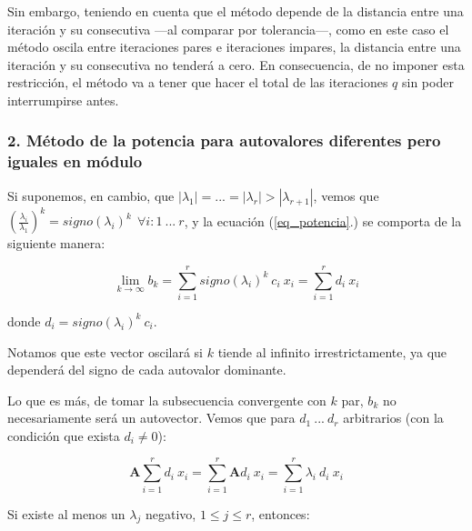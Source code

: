 \vspace{1em}
Sin embargo, teniendo en cuenta que el método depende de la distancia entre una iteración y su consecutiva ---al comparar por tolerancia---, como en este caso el método oscila entre iteraciones pares e iteraciones impares, la distancia entre una iteración y su consecutiva no tenderá a cero. En consecuencia, de no imponer esta restricción, el método va a tener que hacer el total de las iteraciones $q$ sin poder interrumpirse antes. 





\vspace{2em}
\subsubsection*{2. Método de la potencia para autovalores diferentes pero iguales en módulo} 

Si suponemos, en cambio, que $|\lambda_1| = ... = |\lambda_r| > |\lambda_{r + 1}|$, vemos que $(\frac{\lambda_i}{\lambda_1})^k = signo(\lambda_i)^k\ \ \forall i: 1\ ...\ r$, y la ecuación (\ref{eq_potencia}.) se comporta de la siguiente manera:

\begin{equation*}
    \lim_{k \to \infty} b_k = \sum_{i=1}^{r} signo(\lambda_i)^k\ c_i\ x_i = \sum_{i=1}^{r} d_i\ x_i  
\end{equation*}

\vspace{1em}
\noindent donde $d_i = signo(\lambda_i)^k\ c_i$.

\vspace{1em}
\noindent Notamos que este vector oscilará si $k$ tiende al infinito irrestrictamente, ya que dependerá del signo de cada autovalor dominante. 

\vspace{1em}
Lo que es más, de tomar la subsecuencia convergente con $k$ par, $b_k$ no necesariamente será un autovector. Vemos que para $d_1\ ...\ d_r$ arbitrarios (con la condición que exista $d_i \neq 0$):

\begin{equation*}
    \mathbf{A} \sum_{i=1}^{r} d_i\ x_i = \sum_{i=1}^{r} \mathbf{A} d_i\ x_i = \sum_{i=1}^{r} \lambda_i\ d_i\ x_i 
\end{equation*}

\vspace{2em} 
\noindent Si existe al menos un $\lambda_j$ negativo, $1 \leq j \leq r$, entonces:

